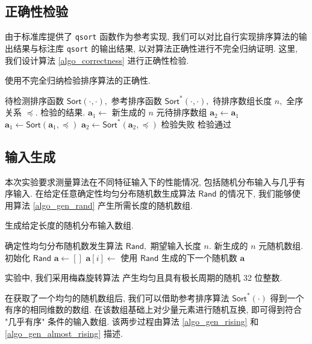 \documentclass[12pt]{article}
\begin{document}
\subsection{正确性检验}

由于标准库提供了 \texttt{qsort} 函数作为参考实现, 我们可以对比自行实现排序算法的输出结果与标注库 \texttt{qsort} 的输出结果, 以对算法正确性进行不完全归纳证明. 这里, 我们设计算法 \ref{algo_correctness} 进行正确性检验.

\begin{algorithm}[H]
\caption{使用不完全归纳检验排序算法的正确性.}
\label{algo_correctness}
\begin{algorithmic}[1]
\Require 待检测排序函数 $\mathsf{Sort}(\cdot, \cdot),$ 参考排序函数 $\mathsf{Sort}^*(\cdot, \cdot),$ 待排序数组长度 $n,$ 全序关系 $\preceq.$
\Ensure 检验的结果.
\State $\bm{a}_1 \gets$ 新生成的 $n$ 元待排序数组
\State $\bm{a}_2 \gets \bm{a}_1$
\State $\bm{a}_1 \gets \mathsf{Sort}(\bm{a}_1, \preceq)$
\State $\bm{a}_2 \gets \mathsf{Sort}^*(\bm{a}_2, \preceq)$
       \State \Return 检验失败
    \EndIf
\EndFor
\State \Return 检验通过
\end{algorithmic}
\end{algorithm}

\subsection{输入生成}

本次实验要求测量算法在不同特征输入下的性能情况, 包括随机分布输入与几乎有序输入. 在给定任意确定性均匀分布随机数生成算法 $\mathsf{Rand}$ 的情况下, 我们能够使用算法 \ref{algo_gen_rand} 产生所需长度的随机数组.

\begin{algorithm}[H]
\caption{生成给定长度的随机分布输入数组.}
\label{algo_gen_rand}
\begin{algorithmic}[1]
\Require 确定性均匀分布随机数发生算法 $\mathsf{Rand},$ 期望输入长度 $n.$
\Ensure 新生成的 $n$ 元随机数组.
\State 初始化 $\mathsf{Rand}$
\State $\bm{a} \gets []$
    \State $\bm{a}[i] \gets$ 使用 $\mathsf{Rand}$ 生成的下一个随机数
\EndFor
\State \Return $\bm{a}$
\end{algorithmic}
\end{algorithm}

实验中, 我们采用梅森旋转算法 \cite{bib_mersenne_randgen} 产生均匀且具有极长周期的随机 32 位整数.

在获取了一个均匀的随机数组后, 我们可以借助参考排序算法 $\mathsf{Sort}^*(\cdot)$ 得到一个有序的相同维数的数组. 在该数组基础上对少量元素进行随机互换, 即可得到符合 "几乎有序" 条件的输入数组. 该两步过程由算法 \ref{algo_gen_rising} 和 \ref{algo_gen_almost_rising} 描述.
\end{document}
